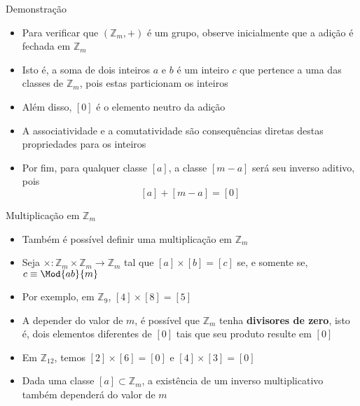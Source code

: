 \begin{frame}[fragile]{Demonstração}

    \begin{itemize}
        \item Para verificar que $(\mathbb{Z}_m, +)$ é um grupo, observe inicialmente que a adição
            é fechada em $\mathbb{Z}_m$

        \item Isto é, a soma de dois inteiros $a$ e $b$ é um inteiro $c$ que pertence a uma das
            classes de $\mathbb{Z}_m$, pois estas particionam os inteiros

        \item Além disso, $[0]$ é o elemento neutro da adição

        \item A associatividade e a comutatividade são consequências diretas destas propriedades
            para os inteiros

        \item Por fim, para qualquer classe $[a]$, a classe $[m - a]$ será seu inverso aditivo,
            pois
        $$
            [a] + [m - a] = [0]
        $$
    \end{itemize}

\end{frame}

\begin{frame}[fragile]{Multiplicação em $\mathbb{Z}_m$}

    \begin{itemize}
        \item Também é possível definir uma multiplicação em $\mathbb{Z}_m$

        \item Seja $\times: \mathbb{Z}_m\times \mathbb{Z}_m\to \mathbb{Z}_m$ tal que $[a]\times [b]
            = [c]$ se, e somente se, $c\equiv \Mod{ab}{m}$

        \item Por exemplo, em $\mathbb{Z}_9$, $[4]\times [8] = [5]$

        \item A depender do valor de $m$, é possível que $\mathbb{Z}_m$ tenha \textbf{divisores de
            zero}, isto é, dois elementos diferentes de $[0]$ tais que seu produto resulte em
            $[0]$

        \item Em $\mathbb{Z}_{12}$, temos $[2]\times [6] = [0]$ e $[4]\times [3] = [0]$

        \item Dada uma classe $[a]\subset \mathbb{Z}_m$, a existência de um inverso multiplicativo
            também dependerá do valor de $m$
    \end{itemize}

\end{frame}

